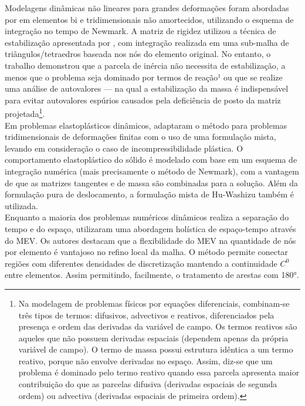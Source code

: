 \indent Modelagens dinâmicas não lineares para grandes deformações foram abordadas por \citet{virtualelementformulationfinitestrainelastodynamics2021} em elementos bi e tridimensionais não amortecidos, utilizando o esquema de integração no tempo de Newmark. A matriz de rigidez utilizou a técnica de estabilização apresentada por \citet{virtualelementmethodcontact2016}, com integração realizada em uma sub-malha de triângulos/tetraedros baseada nos nós do elemento original. No entanto, o trabalho demonstrou que a parcela de inércia não necessita de estabilização, a menos que o problema seja dominado por termos de reação¹ ou que se realize uma análise de autovalores — na qual a estabilização da massa é indispensável para evitar autovalores espúrios causados pela deficiência de posto da matriz projetada\footnote{Na modelagem de problemas físicos por equações diferenciais, combinam-se três tipos de termos: difusivos, advectivos e reativos, diferenciados pela presença e ordem das derivadas da variável de campo. Os termos reativos são aqueles que não possuem derivadas espaciais (dependem apenas da própria variável de campo). O termo de massa possui estrutura idêntica a um termo reativo, porque não envolve derivadas no espaço. Assim, diz-se que um problema é dominado pelo termo reativo quando essa parcela apresenta maior contribuição do que as parcelas difusiva (derivadas espaciais de segunda ordem) ou advectiva (derivadas espaciais de primeira ordem).}.\\
\indent Em problemas elastoplásticos dinâmicos, \citet{3dmixedvirtualelementformulationdynamicelastoplasticanalysis2021a} adaptaram o método para problemas tridimensionais de deformações finitas com o uso de uma formulação mista, levando em consideração o caso de incompressibilidade plástica. O comportamento elastoplástico do sólido é modelado com base em um esquema de integração numérica (mais precisamente o método de Newmark), com a vantagem de que as matrizes tangentes e de massa são combinadas para a solução. Além da formulação pura de deslocamento, a formulação mista de Hu-Washizu também é utilizada. \\
\indent Enquanto a maioria dos problemas numéricos dinâmicos realiza a separação do tempo e do espaço, \citet{spacetimeimplementationwaveequationusingvirtualelements2026} utilizaram uma abordagem holística de espaço-tempo através do MEV. Os autores destacam que a flexibilidade do MEV na quantidade de nós por elemento é vantajoso no refino local da malha. O método permite conectar regiões com diferentes densidades de discretização mantendo a continuidade $C^0$ entre elementos. Assim permitindo, facilmente, o tratamento de arestas com 180°. \\
